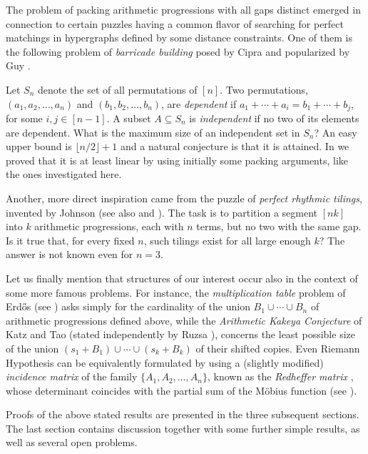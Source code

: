 \documentclass[12pt]{amsart}
\theoremstyle{plain}
\numberwithin{equation}{section}
\begin{document}
The problem of packing arithmetic progressions with all gaps distinct emerged in connection to certain puzzles having a common flavor of searching for perfect matchings in hypergraphs defined by some distance constraints. One of them is the following problem of \emph{barricade building} posed by Cipra and popularized by Guy \cite{Guy}.

Let $S_n$ denote the set of all permutations of $[n]$. Two permutations, $(a_1,a_2,\ldots,a_n)$ and $(b_1,b_2,\ldots,b_n)$, are \emph{dependent} if $a_1+\cdots+a_i=b_1+\cdots+b_j$, for some $i,j \in [n-1]$. A subset $A\subseteq S_n$ is \emph{independent} if no two of its elements are dependent. What is the maximum size of an independent set in $S_n$? An easy upper bound is $\lfloor n/2\rfloor+1$ and a natural conjecture is that it is attained. In \cite{Debski GPPS-N} we proved that it is at least linear by using initially some packing arguments, like the ones investigated here.

Another, more direct inspiration came from the puzzle of \emph{perfect rhythmic tilings}, invented by Johnson \cite{Johnson} (see also \cite{Amiot} and \cite{Sloane}). The task is to partition a segment $[nk]$ into $k$ arithmetic progressions, each with $n$ terms, but no two with the same gap. Is it true that, for every fixed $n$, such tilings exist for all large enough $k$? The answer is not known even for $n=3$.

Let us finally mention that structures of our interest occur also in the context of some more famous problems. For instance, the \emph{multiplication table} problem of Erd\H{o}s \cite{Erdos} (see \cite{Ford}) asks simply for the cardinality of the union $B_1\cup \cdots\cup B_n$ of arithmetic progressions defined above, while the \emph{Arithmetic Kakeya Conjecture} of Katz and Tao \cite{Katz-Tao} (stated independently by Ruzsa \cite{Ruzsa}), concerns the least possible size of the union $(s_1+B_1)\cup \cdots\cup (s_k+B_k)$ of their shifted copies. Even Riemann Hypothesis can be equivalently formulated by using a (slightly modified) \emph{incidence matrix} of the family $\{A_1,A_2,\ldots, A_n\}$, known as the \emph{Redheffer matrix} \cite{Redheffer}, whose determinant coincides with the partial sum of the M\"{o}bius function (see \cite{Broughan}).

Proofs of the above stated results are presented in the three subsequent sections. The last section contains discussion together with some further simple results, as well as several open problems.
\end{document}
